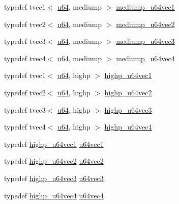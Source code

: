 \begin{DoxyCompactItemize}
\item 
typedef tvec1$<$ \hyperlink{group__gtc__type__precision_ga71cedd4972f9cb1a5e14dfe5ab83ecd7}{u64}, mediump $>$ \hyperlink{namespaceglm_a3a33c749ba3ad607f1f6de75a935aff6}{mediump\+\_\+u64vec1}
\item 
typedef tvec2$<$ \hyperlink{group__gtc__type__precision_ga71cedd4972f9cb1a5e14dfe5ab83ecd7}{u64}, mediump $>$ \hyperlink{namespaceglm_a3668725bbafb9e516fe6735dc00b6a3b}{mediump\+\_\+u64vec2}
\item 
typedef tvec3$<$ \hyperlink{group__gtc__type__precision_ga71cedd4972f9cb1a5e14dfe5ab83ecd7}{u64}, mediump $>$ \hyperlink{namespaceglm_a0b327d5fabbe39c45130155ddd4ccff2}{mediump\+\_\+u64vec3}
\item 
typedef tvec4$<$ \hyperlink{group__gtc__type__precision_ga71cedd4972f9cb1a5e14dfe5ab83ecd7}{u64}, mediump $>$ \hyperlink{namespaceglm_aab6577efa0c0450dc008f7ac27b94373}{mediump\+\_\+u64vec4}
\item 
typedef tvec1$<$ \hyperlink{group__gtc__type__precision_ga71cedd4972f9cb1a5e14dfe5ab83ecd7}{u64}, highp $>$ \hyperlink{namespaceglm_ab40d45399efc4de5cc9c31311e70d8b5}{highp\+\_\+u64vec1}
\item 
typedef tvec2$<$ \hyperlink{group__gtc__type__precision_ga71cedd4972f9cb1a5e14dfe5ab83ecd7}{u64}, highp $>$ \hyperlink{namespaceglm_ad2aeff7982b68bc1beee06a79f172c44}{highp\+\_\+u64vec2}
\item 
typedef tvec3$<$ \hyperlink{group__gtc__type__precision_ga71cedd4972f9cb1a5e14dfe5ab83ecd7}{u64}, highp $>$ \hyperlink{namespaceglm_ad7722375e84d6940412d3b715fec1160}{highp\+\_\+u64vec3}
\item 
typedef tvec4$<$ \hyperlink{group__gtc__type__precision_ga71cedd4972f9cb1a5e14dfe5ab83ecd7}{u64}, highp $>$ \hyperlink{namespaceglm_ae7af7cc2241c15afac54724f0b8855f2}{highp\+\_\+u64vec4}
\item 
typedef \hyperlink{namespaceglm_ab40d45399efc4de5cc9c31311e70d8b5}{highp\+\_\+u64vec1} \hyperlink{group__gtc__type__precision_gaf0a59fdb715cf4ddf0c4dabf0e2286a9}{u64vec1}
\item 
typedef \hyperlink{namespaceglm_ad2aeff7982b68bc1beee06a79f172c44}{highp\+\_\+u64vec2} \hyperlink{group__gtc__type__precision_gaddd85665767e5d32aee8516f00c45f59}{u64vec2}
\item 
typedef \hyperlink{namespaceglm_ad7722375e84d6940412d3b715fec1160}{highp\+\_\+u64vec3} \hyperlink{group__gtc__type__precision_ga7f104c29d70170cfb2223b29f7985bd4}{u64vec3}
\item 
typedef \hyperlink{namespaceglm_ae7af7cc2241c15afac54724f0b8855f2}{highp\+\_\+u64vec4} \hyperlink{group__gtc__type__precision_gadafdefd5524bf6a48bb7c47edb787ae5}{u64vec4}

\end{DoxyCompactItemize}

